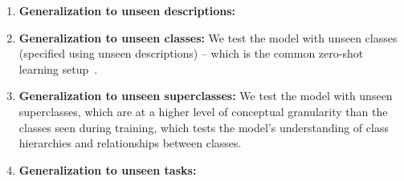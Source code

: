 
\usepackage{enumitem}

\begin{enumerate}[leftmargin=*,itemsep=0em,label=(\scenarioenum{S}{{\arabic*}})]
    \item \textbf{Generalization to unseen descriptions:} 
    \item \textbf{Generalization to unseen classes:} We test the model with unseen classes (specified using unseen descriptions) -- which is the common zero-shot learning setup~\cite{akata2015label,zhang2017learning}.
    \item \textbf{Generalization to unseen superclasses:} We test the model with unseen superclasses, which are at a higher level of conceptual granularity than the classes seen during training, which tests the model's understanding of class hierarchies and relationships between classes.
    \item \textbf{Generalization to unseen tasks:} 
\end{enumerate}
